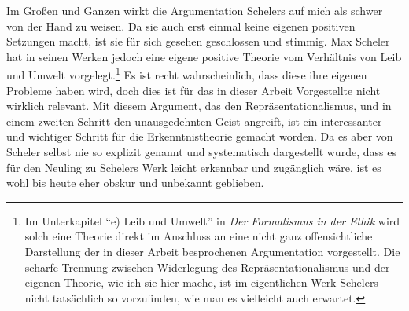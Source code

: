 \documentclass[a4paper, 12pt]{article}
\begin{document}
\begin{onehalfspace}
Im Großen und Ganzen wirkt die Argumentation Schelers auf mich als schwer von der Hand zu weisen. Da sie auch erst einmal keine eigenen positiven Setzungen macht, ist sie für sich gesehen geschlossen und stimmig. Max Scheler hat in seinen Werken jedoch eine eigene positive Theorie vom Verhältnis von Leib und Umwelt vorgelegt.\footnote{Im Unterkapitel "`e) Leib und Umwelt"' in \emph{Der Formalismus in der Ethik} \citep[Vgl.][S. 489 bis 510]{scheler-ethik} wird solch eine Theorie direkt im Anschluss an eine nicht ganz offensichtliche Darstellung der in dieser Arbeit besprochenen Argumentation vorgestellt. Die scharfe Trennung zwischen Widerlegung des Repräsentationalismus und der eigenen Theorie, wie ich sie hier mache, ist im eigentlichen Werk Schelers nicht tatsächlich so vorzufinden, wie man es vielleicht auch erwartet. } Es ist recht wahrscheinlich, dass diese ihre eigenen Probleme haben wird, doch dies ist für das in dieser Arbeit Vorgestellte nicht wirklich relevant. Mit diesem Argument, das den Repräsentationalismus, und in einem zweiten Schritt den unausgedehnten Geist angreift, ist ein interessanter und wichtiger Schritt für die Erkenntnistheorie gemacht worden. Da es aber von Scheler selbst nie so explizit genannt und systematisch dargestellt wurde, dass es für den Neuling zu Schelers Werk leicht erkennbar und zugänglich wäre, ist es wohl bis heute eher obskur und unbekannt geblieben. %







\end{onehalfspace}
\end{document}
